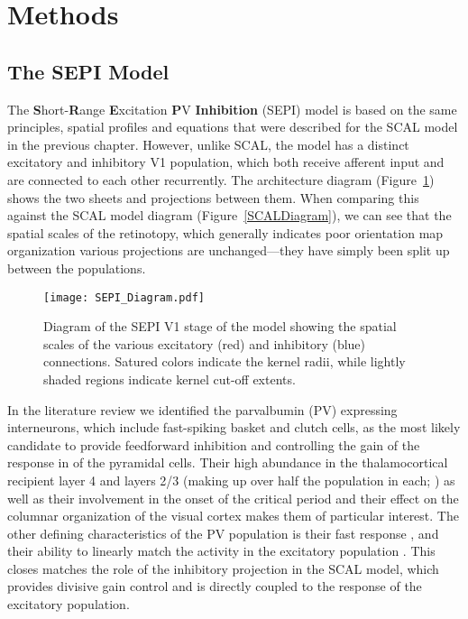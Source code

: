 \section{Methods}

\subsection{The SEPI Model}

The \textbf{S}hort-\textbf{R}ange \textbf{E}xcitation \textbf{P}V
\textbf{Inhibition} (SEPI) model is based on the same principles,
spatial profiles and equations that were described for the SCAL model
in the previous chapter. However, unlike SCAL, the model has a
distinct excitatory and inhibitory V1 population, which both receive
afferent input and are connected to each other recurrently. The
architecture diagram (Figure~\ref{SEPIDiagram}) shows the two sheets
and projections between them. When comparing this against the SCAL
model diagram (Figure~\ref{SCALDiagram}), we can see that the
spatial scales of the retinotopy, which generally indicates poor
orientation map organization various projections are unchanged---they
have simply been split up between the populations.

\begin{figure}
	\centering
        \texttt{[image: SEPI\_Diagram.pdf]}
	\caption{Diagram of the SEPI V1 stage of the model showing the
          spatial scales of the various excitatory (red) and
          inhibitory (blue) connections. Satured colors indicate the
          kernel radii, while lightly shaded regions indicate kernel
          cut-off extents.}
	\label{SEPIDiagram}
\end{figure}

In the literature review we identified the parvalbumin (PV) expressing
interneurons, which include fast-spiking basket and clutch cells, as
the most likely candidate to provide feedforward inhibition and
controlling the gain of the response in of the pyramidal cells. Their
high abundance in the thalamocortical recipient layer 4 and layers 2/3
(making up over half the population in each; \citealt{VanBrederode1990}) as
well as their involvement in the onset of the critical period
\citep{Fagiolini2000} and their effect on the columnar organization of the
visual cortex \citep{Hensch2004} makes them of particular interest. The
other defining characteristics of the PV population is their fast
response \citep{Cruikshank2007,Gabernet2005}, and their ability to
linearly match the activity in the excitatory population
\citep{Atallah2012}. This closes matches the role of the inhibitory
projection in the SCAL model, which provides divisive gain control and
is directly coupled to the response of the excitatory population.

